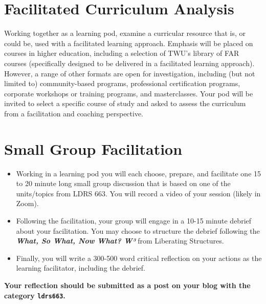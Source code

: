 \documentclass[
]{book}
\providecommand{\tightlist}{%
  \setlength{\itemsep}{0pt}\setlength{\parskip}{0pt}}
\begin{document}
\hypertarget{facilitated-curriculum-analysis}{%
\section*{Facilitated Curriculum Analysis}\label{facilitated-curriculum-analysis}}

Working together as a learning pod, examine a curricular resource that is, or could be, used with a facilitated learning approach. Emphasis will be placed on courses in higher education, including a selection of TWU's library of FAR courses (specifically designed to be delivered in a facilitated learning approach). However, a range of other formats are open for investigation, including (but not limited to) community-based programs, professional certification programs, corporate workshops or training programs, and masterclasses. Your pod will be invited to select a specific course of study and asked to assess the curriculum from a facilitation and coaching perspective.

\hypertarget{small-group-facilitation}{%
\section*{Small Group Facilitation}\label{small-group-facilitation}}

\begin{itemize}
\tightlist
\item
  Working in a learning pod you will each choose, prepare, and facilitate one 15 to 20 minute long small group discussion that is based on one of the units/topics from LDRS 663. You will record a video of your session (likely in Zoom).\\
\item
  Following the facilitation, your group will engage in a 10-15 minute debrief about your facilitation. You may choose to structure the debrief following the \textbf{\emph{What, So What, Now What? W³}} from Liberating Structures.\\
\item
  Finally, you will write a 300-500 word critical reflection on your actions as the learning facilitator, including the debrief.
\end{itemize}

\textbf{Your reflection should be submitted as a post on your blog with the category \texttt{ldrs663}.}
\end{document}
